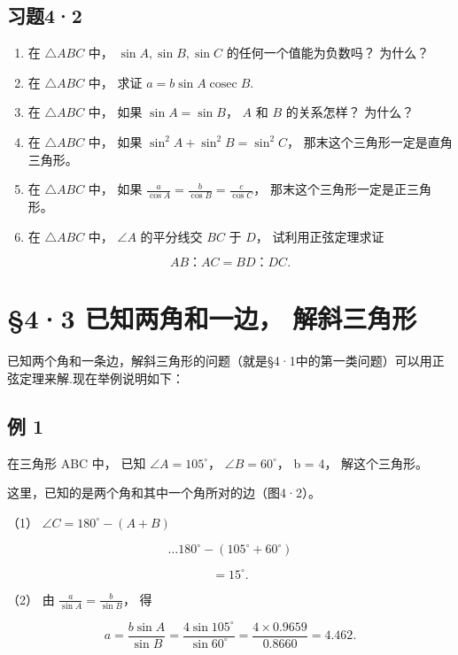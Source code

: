 \subsection{习题4·2}

\begin{enumerate}
\item
  在 \(\triangle ABC\) 中， \(\sin A, \sin B, \sin C\)
  的任何一个值能为负数吗？ 为什么？
\item
  在 \(\triangle ABC\) 中， 求证 \(a = b\sin A \operatorname{cosec} B\).
\item
  在 \(\triangle ABC\) 中， 如果 \(\sin A = \sin B\)， \(A\) 和 \(B\)
  的关系怎样？ 为什么？
\item
  在 \(\triangle ABC\) 中， 如果 \(\sin^2 A + \sin^2 B = \sin^2 C\)，
  那末这个三角形一定是直角三角形。
\item
  在 \(\triangle ABC\) 中， 如果
  \(\frac{a}{\cos A} = \frac{b}{\cos B} = \frac{c}{\cos C}\)，
  那末这个三角形一定是正三角形。
\item
  在 \(\triangle ABC\) 中， \(\angle A\) 的平分线交 \(BC\) 于 \(D\)，
  试利用正弦定理求证
\end{enumerate}

\[
A B\text{：} A C = B D\text{：} D C.
\]

\section{§4·3 已知两角和一边， 解斜三角形}

已知两个角和一条边，解斜三角形的问题（就是§4·1中的第一类问题）可以用正弦定理来解.现在举例说明如下：

\subsection{例 1}

在三角形 ABC 中， 已知 \(\angle A = 105^{\circ}\)，
\(\angle B = 60^{\circ}\)， b = 4， 解这个三角形。

 这里，已知的是两个角和其中一个角所对的边（图4·2）。

（1） \(\angle C = 180^{\circ} - (A + B)\)

\[
\dots 180 ^{\circ} - (105 ^{\circ} + 60 ^{\circ})
\]

\[
= 15 ^{\circ}.
\]

（2） 由 \(\frac{a}{\sin A} = \frac{b}{\sin B}\)， 得

\[
a = \frac {b \sin A}{\sin B} = \frac {4 \sin 105 ^{\circ}}{\sin 60 ^{\circ}} = \frac {4 \times 0.9659}{0.8660} = 4.462.
\]

